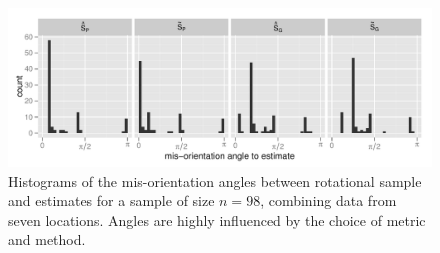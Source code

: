 \begin{figure}[htbp] %
   \centering
   \includegraphics[width=\textwidth]{images/histogram-7} 
   \caption{Histograms of the mis-orientation angles between rotational sample and estimates for a sample of size  $n=98$, combining data from seven locations. Angles are highly influenced by the choice of metric and method. }
   \label{fig:histograms}
\end{figure}
